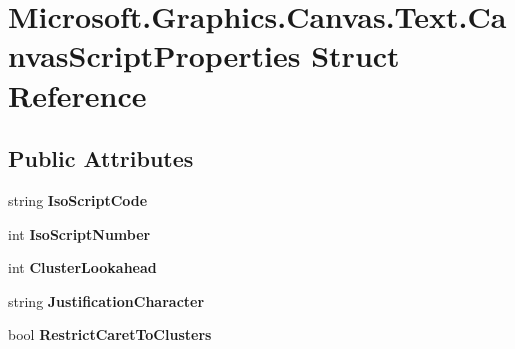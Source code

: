 \hypertarget{struct_microsoft_1_1_graphics_1_1_canvas_1_1_text_1_1_canvas_script_properties}{}\section{Microsoft.\+Graphics.\+Canvas.\+Text.\+Canvas\+Script\+Properties Struct Reference}
\label{struct_microsoft_1_1_graphics_1_1_canvas_1_1_text_1_1_canvas_script_properties}
\subsection*{Public Attributes}
\begin{DoxyCompactItemize}
\item 
\mbox{\label{struct_microsoft_1_1_graphics_1_1_canvas_1_1_text_1_1_canvas_script_properties_a44b262c1813ede5430a91c9ae5c72ca3}} 
string {\bfseries Iso\+Script\+Code}
\item 
\mbox{\label{struct_microsoft_1_1_graphics_1_1_canvas_1_1_text_1_1_canvas_script_properties_a659fcc883c406f3849934b4b447a9f67}} 
int {\bfseries Iso\+Script\+Number}
\item 
\mbox{\label{struct_microsoft_1_1_graphics_1_1_canvas_1_1_text_1_1_canvas_script_properties_ab3e675f9ad479bd27002fd239a825251}} 
int {\bfseries Cluster\+Lookahead}
\item 
\mbox{\label{struct_microsoft_1_1_graphics_1_1_canvas_1_1_text_1_1_canvas_script_properties_af75effd8d7e5994716ed3a4ed88c2b80}} 
string {\bfseries Justification\+Character}
\item 
\mbox{\label{struct_microsoft_1_1_graphics_1_1_canvas_1_1_text_1_1_canvas_script_properties_a2d13583c6d3ccd71ca5d7364884b42f2}} 
bool {\bfseries Restrict\+Caret\+To\+Clusters}
\item 
\mbox{\label{struct_microsoft_1_1_graphics_1_1_canvas_1_1_text_1_1_canvas_script_properties_a9b0916dd0ffce2aab59feff2c1d3d749}} 

\end{DoxyCompactItemize}
